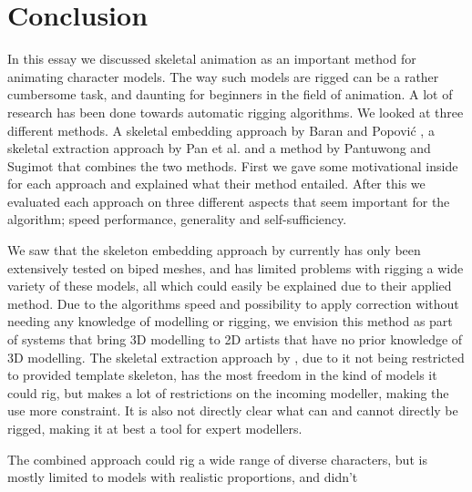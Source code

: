 \documentclass{article}
\begin{document}
\section{Conclusion}
In this essay we discussed skeletal animation as an important method for
animating character models. The way such models are rigged can be a rather
cumbersome task, and daunting for beginners in the field of animation. A lot of
research has been done towards automatic rigging algorithms. We looked at three
different methods. A skeletal embedding approach by Baran and Popovi\'{c} \citep{paper1}, a skeletal
extraction approach by Pan et al. \citep{paper2} and a method by Pantuwong and
Sugimot \citep{paper2} that
combines the two methods. First we gave some motivational inside for each
approach and explained what their method entailed. After this we evaluated each
approach on three different aspects that seem important for the algorithm; speed
performance, generality and self-sufficiency. 

We saw that the skeleton embedding approach by \citep{paper1} currently has only
been extensively tested on biped meshes, and has limited problems with rigging a
wide variety of these models, all which could easily be explained due to their
applied method. Due to the algorithms speed and possibility to apply correction
without needing any knowledge of modelling or rigging, we envision this method
as part of systems that bring 3D modelling to 2D artists that have no prior
knowledge of 3D modelling.
The skeletal extraction approach by \citep{paper2}, due to it not being restricted to provided
template skeleton, has the most freedom in the kind of models it could rig, but
makes a lot of restrictions on the incoming modeller, making the use more
constraint. It is also not directly clear what can and cannot directly be
rigged, making it at best a tool for expert modellers. 

The combined approach could rig a wide range of diverse characters, but is mostly
limited to models with realistic proportions, and didn't




\end{document}
